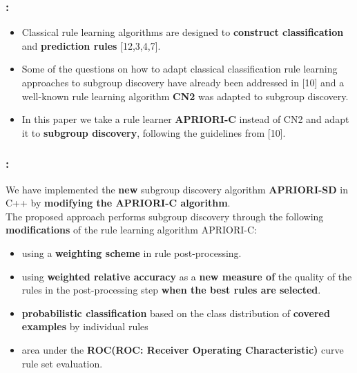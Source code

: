 \documentclass{beamer}
\begin{document}
\begin{CJK*}{UTF8}{bsmi}

\begin{frame}
	\frametitle{\insertsection : \insertsubsection}
	\begin{itemize}
		\item Classical rule learning algorithms are designed to \textbf{construct classification} and \textbf{prediction rules} [12,3,4,7].
		\item Some of the questions on how to adapt classical classification rule learning approaches to subgroup discovery have already been addressed in [10] and a well-known rule learning algorithm \textbf{CN2} was adapted to subgroup discovery. 
		\item In this paper we take a rule learner \textbf{APRIORI-C }instead of CN2 and adapt it to \textbf{subgroup discovery}, following the guidelines from [10].
	\end{itemize}
\end{frame}
\begin{frame}
	\frametitle{\insertsection : \insertsubsection}
	We have implemented the \textbf{new} subgroup discovery algorithm\textbf{ APRIORI-SD }in C++ by \textbf{modifying the APRIORI-C algorithm}.\\
	The proposed approach performs subgroup discovery through the following \textbf{modifications} of the rule learning algorithm APRIORI-C: 
	\begin{itemize}
		\item using a \textbf{weighting scheme} in rule post-processing.
		\item using \textbf{weighted relative accuracy} as a \textbf{new measure of} the quality of the rules in the post-processing step \textbf{when the best rules are selected}.
		\item \textbf{probabilistic classification} based on the class distribution of \textbf{covered examples} by individual rules
		\item area under the \textbf{ROC(ROC: Receiver Operating Characteristic)} curve rule set evaluation.

\end{itemize}
\end{frame}
\end{CJK*}
\end{document}
